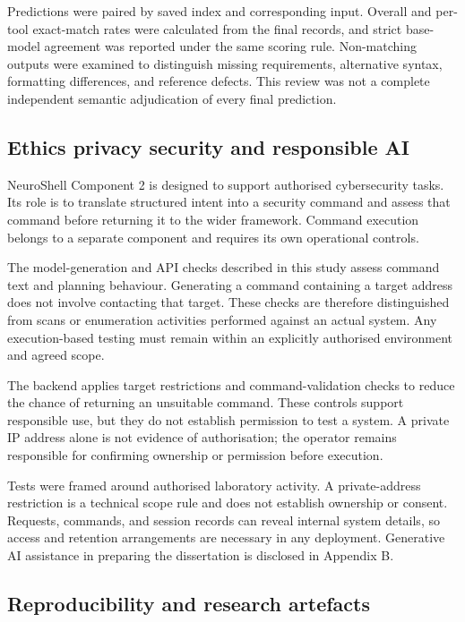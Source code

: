 \documentclass[
]{article}
\begin{document}
Predictions were paired by saved index and corresponding input. Overall
and per-tool exact-match rates were calculated from the final records,
and strict base-model agreement was reported under the same scoring
rule. Non-matching outputs were examined to distinguish missing
requirements, alternative syntax, formatting differences, and reference
defects. This review was not a complete independent semantic
adjudication of every final prediction.

\hypertarget{ethics-privacy-security-and-responsible-ai}{%
\subsection{\texorpdfstring{ Ethics privacy security and responsible
AI}{ Ethics privacy security and responsible AI}}\label{ethics-privacy-security-and-responsible-ai}}

NeuroShell Component 2 is designed to support authorised cybersecurity
tasks. Its role is to translate structured intent into a security
command and assess that command before returning it to the wider
framework. Command execution belongs to a separate component and
requires its own operational controls.

The model-generation and API checks described in this study assess
command text and planning behaviour. Generating a command containing a
target address does not involve contacting that target. These checks are
therefore distinguished from scans or enumeration activities performed
against an actual system. Any execution-based testing must remain within
an explicitly authorised environment and agreed scope.

The backend applies target restrictions and command-validation checks to
reduce the chance of returning an unsuitable command. These controls
support responsible use, but they do not establish permission to test a
system. A private IP address alone is not evidence of authorisation; the
operator remains responsible for confirming ownership or permission
before execution.

Tests were framed around authorised laboratory activity. A
private-address restriction is a technical scope rule and does not
establish ownership or consent. Requests, commands, and session records
can reveal internal system details, so access and retention arrangements
are necessary in any deployment. Generative AI assistance in preparing
the dissertation is disclosed in Appendix B.

\hypertarget{reproducibility-and-research-artefacts}{%
\subsection{Reproducibility and research
artefacts}\label{reproducibility-and-research-artefacts}}
\end{document}
